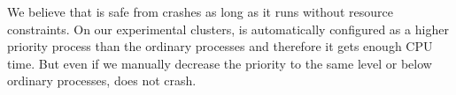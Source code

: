 We believe that  is safe from crashes as long as it runs without resource constraints. On our experimental clusters,  is automatically configured as a higher priority process than the ordinary processes and therefore it gets enough CPU time. But even if we manually decrease the priority to the same level or below ordinary processes,  does not crash.